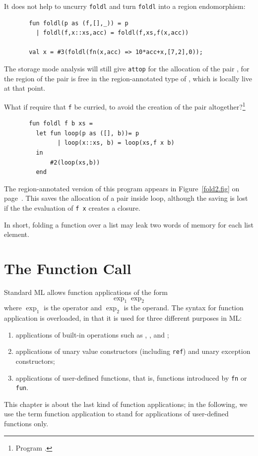 \documentclass[12pt]{book}
\begin{document}
It does not help to uncurry {\tt foldl} and turn {\tt foldl} into a region endomorphism: 
\begin{verbatim}
       fun foldl(p as (f,[],_)) = p
         | foldl(f,x::xs,acc) = foldl(f,xs,f(x,acc))

       val x = #3(foldl(fn(x,acc) => 10*acc+x,[7,2],0));
\end{verbatim}
The storage mode analysis will still give {\tt attop} for
the allocation of the pair , for
the region of the pair is free in the region-annotated type of ,
which is locally live at that point.

What if require that {\tt f} be curried, to avoid the creation of the pair 
altogether?\footnote{Program .}
\begin{verbatim}
       fun foldl f b xs = 
         let fun loop(p as ([], b))= p
               | loop(x::xs, b) = loop(xs,f x b)
         in
             #2(loop(xs,b))
         end
\end{verbatim}
The region-annotated version of this program appears in Figure~\ref{fold2.fig} 
on page~\pageref{fold2.fig}. This saves the allocation of a pair inside loop,
although the saving is  lost if the the evaluation of {\tt f x} creates a closure.

In short, folding a function over a list may leak two words of memory for each
list element. 

\chapter{The Function Call}
Standard ML allows function applications of the form
$$\exp_1 \exp_2$$
where $\exp_1$ is the operator and $\exp_2$ is the operand.
The syntax for  function application is overloaded, in that it is used
for  three different purposes in ML:
\begin{enumerate}
\item applications of built-in operations such as \boxml{+}, \boxml{=}, and \boxml{:=};
\item applications of unary value constructors (including {\tt ref}) and unary exception constructors;
\item applications of user-defined functions, that is, functions introduced by {\tt fn} or {\tt fun}.
\end{enumerate}
This chapter is about the last kind of function applications; in the following,
we use the term function application to stand for applications of user-defined functions
only.
\end{document}
